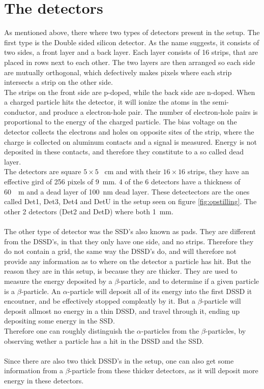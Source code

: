 \section{The detectors}
As mentioned above, there where two types of detectors present in the setup. The first type is the Double sided silicon detector. 
As the name suggests, it consists of two sides, a front layer and a back layer. Each layer consists of 16 strips, that are placed in rows next to each other. The two layers are then arranged so each side are mutually orthogonal, which defectively makes pixels where each strip intersects a strip on the other side. \\
The strips on the front side are p-doped, while the back side are n-doped. When a charged particle hits the detector, it will ionize the atoms in the semi-conductor, and produce a electron-hole pair. The number of electron-hole pairs is proportional to the energy of the charged particle. 
The bias voltage on the detector collects the electrons and holes on opposite sites of the strip, where the charge is collected on aluminum contacts and a signal is measured. Energy is not deposited in these contacts, and therefore they constitute to a so called dead layer. \\
The detectors are square $5\times 5$ \SI{}{cm} and with their $16\times 16$ strips, they have an effective gird of  256 pixels of \SI{9}{mm}. 
4 of the 6 detectors have a thickness of \SI{60}{\mu m} and a dead layer of \SI{100}{nm} dead layer. These detectectors are the ones called Det1, Det3, Det4 and DetU in the setup seen on figure \ref{fig:opstilling}. The other 2 detectors (Det2 and DetD) where both \SI{1}{mm}.
\\
\\
The other type of detector was the SSD's also known as pads. They are different from the DSSD's, in that they only have one side, and no strips. Therefore they do not contain a grid, the same way the DSSD's do, and will therefore not provide any information as to where on the detector a particle has hit. But the reason they are in this setup, is because they are thicker. They are used to measure the energy deposited by a $\beta$-particle, and to determine if a given particle is a $\beta$-particle. An $\alpha$-particle will deposit all of its energy into the first DSSD it encoutner, and be effectively stopped compleatly by it. But a $\beta$-particle will deposit allmost no energy in a thin DSSD, and travel through it, ending up depositing some energy in the SSD. \\
Therefore one can roughly distinguish the $\alpha$-particles from the $\beta$-particles, by observing wether a particle has a hit in the DSSD and the SSD. \\
\\
Since there are also two thick DSSD's in the setup, one can also get some information from a $\beta$-particle from these thicker detectors, as it will deposit more energy in these detectors. 





